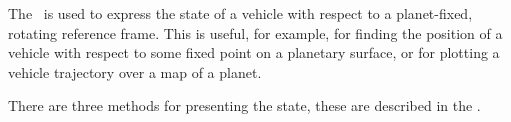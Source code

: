 %
%
% 
%



The \PlanetaryDesc\ is used to express the state of a vehicle with respect to a planet-fixed, rotating reference frame.  This is useful, for example, for finding the position of a vehicle with respect to some fixed point on a planetary surface, or for plotting a vehicle trajectory over a map of a planet.

There are three methods for presenting the state, these are described in the .
